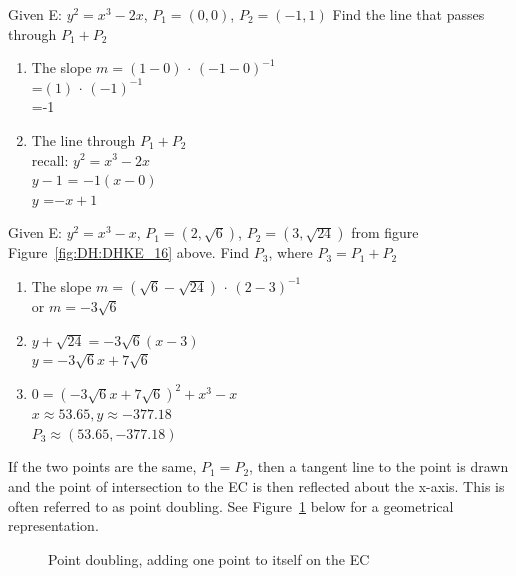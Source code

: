 \begin{eg} Given E: $y^2 = x^3 - 2x$, $P_1 = (0,0)$, $P_2 = (-1,1)$
	Find the line that passes through $P_1 + P_2$
		\begin{enumerate}[(1)] 
	\item The slope $m =(1 - 0)$ $\cdot$ $(-1- 0)^{-1}$ \\
		\text{ \qquad \: \: \:} =$(1)$ $\cdot$ $(-1)^{-1}$ \\
		\text{ \qquad \: \: \:} =-1 
	\item The line through $P_1 + P_2$ \\
		\text{ \qquad \: \:} recall: $y^2 = x^3 - 2x$ \\
		\text{ \qquad \: \:} $y - 1$ = $-1(x- 0)$ \\
		\text{ \qquad \: \:} $y$ =$-x + 1$ 
\end {enumerate} 
\end{eg}

\begin{eg} Given E: $y^2 = x^3 - x$, $P_1 = (2, \sqrt{6})$, $P_2 = (3, \sqrt{24})$ from figure Figure~\ref{fig:DH:DHKE_16} above.
	Find $P_3$, where $P_3 = P_1 + P_2$
		\begin{enumerate}[(1)] 
	\item The slope $m =(\sqrt{6} - \sqrt{24})$ $\cdot$ $(2- 3)^{-1}$ \\
		\text{ \qquad \: \:} or $m = -3\sqrt{6}$ 
	\item $y + \sqrt{24} = -3\sqrt{6}(x - 3)$ \\
		$y = -3\sqrt{6}x + 7\sqrt{6}$
	\item $0 = (-3\sqrt{6}x + 7\sqrt{6})^2 + x^3 - x$\\
		$x \approx 53.65, y \approx -377.18$\\
		$P_3 \approx (53.65, -377.18)$
\end {enumerate}  
\end{eg}

If the two points are the same, $P_1 = P_2$, then a tangent line to the point is drawn and the point of intersection to the EC is then reflected about the x-axis.  This is often referred to as point doubling. See Figure~\ref{fig:DH:DHKE_7} below for a geometrical representation.
\begin{figure}[H]
	  \caption{\label{fig:DH:DHKE_7} Point doubling, adding one point to itself on the EC}
\end{figure}

